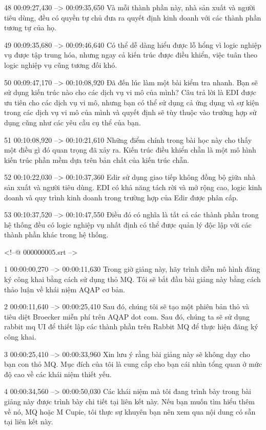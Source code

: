 48
00:09:27,430 --> 00:09:35,650
Và mỗi thành phần này, nhà sản xuất và người tiêu dùng, đều có quyền tự chủ đưa ra quyết định kinh doanh với các thành phần tương tự của họ.

49
00:09:35,680 --> 00:09:46,640
Có thể dễ dàng hiểu được lỗ hổng vì logic nghiệp vụ được tập trung hóa, nhưng ngay cả kiến ​​trúc được điều khiển, việc tuân theo logic nghiệp vụ cũng tương đối khó.

50
00:09:47,170 --> 00:10:08,920
Đã đến lúc làm một bài kiểm tra nhanh.  Bạn sẽ sử dụng kiến ​​trúc nào cho các dịch vụ vi mô của mình?  Câu trả lời là EDI được ưu tiên cho các dịch vụ vi mô, nhưng bạn có thể sử dụng cả ứng dụng và sự kiện trong các dịch vụ vi mô của mình và quyết định sẽ tùy thuộc vào trường hợp sử dụng cũng như các yêu cầu cụ thể của bạn.

51
00:10:08,920 --> 00:10:21,610
Những điểm chính trong bài học này cho thấy một điều gì đó quan trọng đã xảy ra.  Kiến trúc điều khiển chẵn là một mô hình kiến ​​trúc phần mềm dựa trên bản chất của kiến ​​trúc chẵn.

52
00:10:22,030 --> 00:10:37,360
Edir sử dụng giao tiếp không đồng bộ giữa nhà sản xuất và người tiêu dùng.  EDI có khả năng tách rời và mở rộng cao, logic kinh doanh và quy trình kinh doanh trong trường hợp của Edir được phân cấp.

53
00:10:37,520 --> 00:10:47,550
Điều đó có nghĩa là tất cả các thành phần trong hệ thống đều có logic nghiệp vụ nhất định có thể được quản lý độc lập với các thành phần khác trong hệ thống.

<!--@ 000000005.srt -->

1
00:00:00,270 --> 00:00:11,630
Trong giờ giảng này, hãy trình diễn mô hình đăng ký công khai bằng cách sử dụng thỏ MQ.  Tôi sẽ bắt đầu bài giảng này bằng cách thảo luận về khái niệm AQAP cơ bản.

2
00:00:11,640 --> 00:00:25,410
Sau đó, chúng tôi sẽ tạo một phiên bản thỏ và tiêu diệt Broecker miễn phí trên AQAP dot com.  Sau đó, chúng ta sẽ sử dụng rabbit mq UI để thiết lập các thành phần trên Rabbit MQ để thực hiện đăng ký công khai.

3
00:00:25,410 --> 00:00:33,960
Xin lưu ý rằng bài giảng này sẽ không dạy cho bạn con thỏ MQ.  Mục đích của tôi là cung cấp cho bạn cái nhìn tổng quan ở mức độ cao về các khái niệm thiết yếu.

4
00:00:34,560 --> 00:00:50,030
Các khái niệm mà tôi đang trình bày trong bài giảng này được trình bày chi tiết tại liên kết này.  Nếu bạn muốn tìm hiểu thêm về nó, MQ hoặc M Cupie, tôi thực sự khuyên bạn nên xem qua nội dung có sẵn tại liên kết này.


